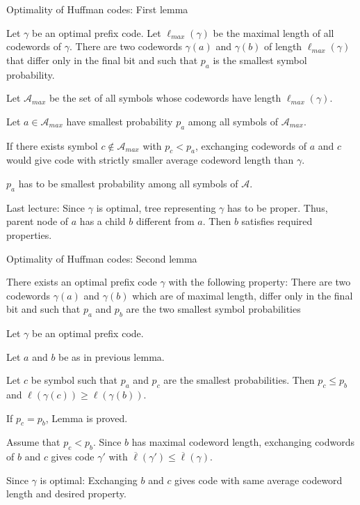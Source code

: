 \begin{frame}{Optimality of Huffman codes: First lemma}
\begin{lemma}
Let $\gamma$ be an optimal prefix code. Let $\ell_{max}(\gamma)$ be the maximal length of all codewords of $\gamma$. 
There are two codewords $\gamma(a)$ and $\gamma(b)$ of length $\ell_{max}(\gamma)$ that differ only in the final bit and such that 
$p_a$ is the smallest symbol probability.
\end{lemma}
\bit
\item Let $\mathcal{A}_{max}$ be the set of all symbols whose codewords have length $\ell_{max}(\gamma)$.
\item Let $a\in\mathcal{A}_{max}$ have smallest probability $p_a$ among all symbols of $\mathcal{A}_{max}$. 
\item If there exists  
symbol $c\notin\mathcal{A}_{max}$  with $p_c<p_a$, exchanging codewords of $a$ and $c$ would 
give code with strictly smaller average codeword length than $\gamma$. 
\item [\iarrow] $p_a$ has to be smallest probability among all 
symbols of $\mathcal{A}$. 
\item[\iarrow]Last lecture: Since $\gamma$ is optimal, tree representing $\gamma$ has to be proper.
Thus, parent node of $a$ has a child $b$ different from $a$. Then $b$ satisfies required properties.
\eit 
\end{frame}

\begin{frame}{Optimality of Huffman codes: Second lemma}
\begin{lemma}
There exists an optimal prefix code $\gamma$ with the following property: 
There are two codewords $\gamma(a)$ and $\gamma(b)$ which are of maximal length, differ only in the final bit and such that 
$p_a$ and $p_b$ are the two smallest symbol probabilities 
\end{lemma}
\bit
\item Let $\gamma$ be an optimal prefix code.
\item  Let $a$ and $b$ be as in previous lemma.
\item Let $c$  be symbol such that $p_a$ and $p_c$ are the smallest probabilities. Then $p_c\leq p_b$ and $\ell(\gamma(c))\geq \ell(\gamma(b))$. 
\item If $p_c=p_b$, Lemma is proved.
\item Assume that $p_c<p_b$. Since $b$ has maximal codeword length, exchanging codwords of $b$ and $c$ gives code $\gamma'$ with $\overline{\ell}(\gamma')\leq \overline{\ell}(\gamma)$.  
\item[\iarrow] Since $\gamma$ is optimal:  Exchanging $b$ and $c$ gives code with same average codeword length and desired property. 
\eit 
\end{frame}

